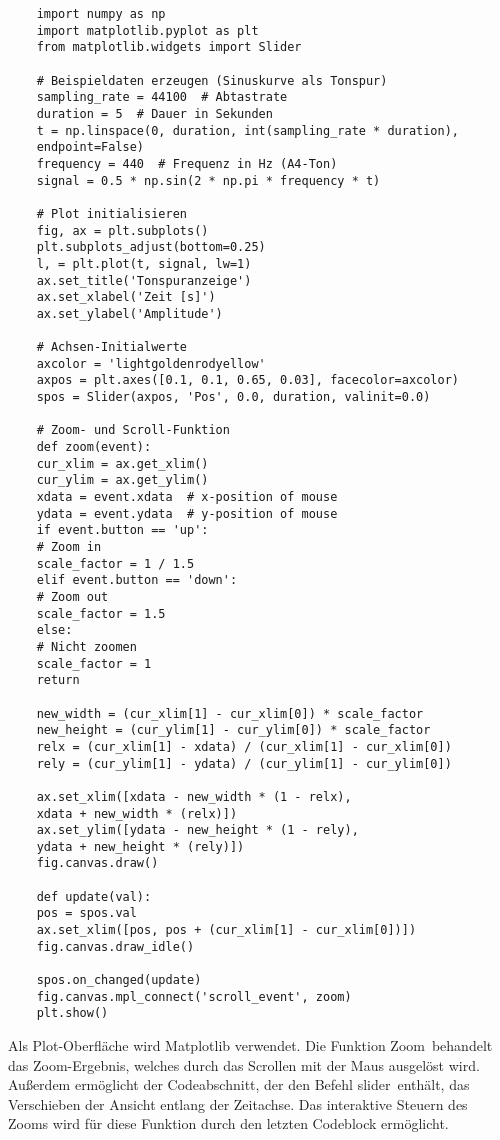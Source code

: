 \begin{verbatim}
    import numpy as np
    import matplotlib.pyplot as plt
    from matplotlib.widgets import Slider
    
    # Beispieldaten erzeugen (Sinuskurve als Tonspur)
    sampling_rate = 44100  # Abtastrate
    duration = 5  # Dauer in Sekunden
    t = np.linspace(0, duration, int(sampling_rate * duration),
    endpoint=False)
    frequency = 440  # Frequenz in Hz (A4-Ton)
    signal = 0.5 * np.sin(2 * np.pi * frequency * t)
    
    # Plot initialisieren
    fig, ax = plt.subplots()
    plt.subplots_adjust(bottom=0.25)
    l, = plt.plot(t, signal, lw=1)
    ax.set_title('Tonspuranzeige')
    ax.set_xlabel('Zeit [s]')
    ax.set_ylabel('Amplitude')
    
    # Achsen-Initialwerte
    axcolor = 'lightgoldenrodyellow'
    axpos = plt.axes([0.1, 0.1, 0.65, 0.03], facecolor=axcolor)
    spos = Slider(axpos, 'Pos', 0.0, duration, valinit=0.0)
    
    # Zoom- und Scroll-Funktion
    def zoom(event):
    cur_xlim = ax.get_xlim()
    cur_ylim = ax.get_ylim()
    xdata = event.xdata  # x-position of mouse
    ydata = event.ydata  # y-position of mouse
    if event.button == 'up':
    # Zoom in
    scale_factor = 1 / 1.5
    elif event.button == 'down':
    # Zoom out
    scale_factor = 1.5
    else:
    # Nicht zoomen
    scale_factor = 1
    return
    
    new_width = (cur_xlim[1] - cur_xlim[0]) * scale_factor
    new_height = (cur_ylim[1] - cur_ylim[0]) * scale_factor
    relx = (cur_xlim[1] - xdata) / (cur_xlim[1] - cur_xlim[0])
    rely = (cur_ylim[1] - ydata) / (cur_ylim[1] - cur_ylim[0])
    
    ax.set_xlim([xdata - new_width * (1 - relx), 
    xdata + new_width * (relx)])
    ax.set_ylim([ydata - new_height * (1 - rely), 
    ydata + new_height * (rely)])
    fig.canvas.draw()
    
    def update(val):
    pos = spos.val
    ax.set_xlim([pos, pos + (cur_xlim[1] - cur_xlim[0])])
    fig.canvas.draw_idle()
    
    spos.on_changed(update)
    fig.canvas.mpl_connect('scroll_event', zoom)
    plt.show()
\end{verbatim}

Als Plot-Oberfläche wird Matplotlib verwendet. Die Funktion \glqq Zoom\grqq \ behandelt das Zoom-Ergebnis, welches durch das Scrollen mit der Maus ausgelöst wird. Außerdem ermöglicht der Codeabschnitt, der den Befehl \glqq slider\grqq \ enthält, das Verschieben der Ansicht entlang der Zeitachse. Das interaktive Steuern des Zooms wird für diese Funktion durch den letzten Codeblock ermöglicht.

